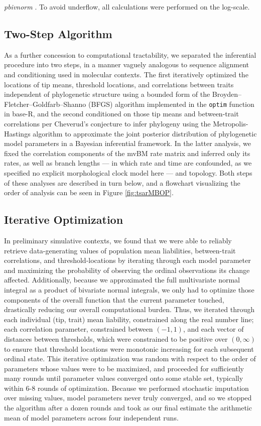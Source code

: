 \documentclass[10pt, twocolumn, twoside]{article}
\begin{document}
\textit{pbivnorm} \citep{kenkelPackagePbivnorm2015}. To avoid underflow, all calculations were performed on the log-scale. 

\subsection{Two-Step Algorithm}

As a further concession to computational tractability, we separated the inferential procedure into two steps, in a manner vaguely analogous to sequence alignment and conditioning used in molecular contexts. The first iteratively optimized the locations of tip means, threshold locations, and correlations between traits independent of phylogenetic structure using a bounded form of the Broyden–Fletcher–Goldfarb–Shanno (BFGS) algorithm implemented in the \texttt{optim} function in base-R, and the second conditioned on those tip means and between-trait correlations per Cheverud's conjecture to infer phylogeny using the Metropolis-Hastings algorithm to approximate the joint posterior distribution of phylogenetic model parameters in a Bayesian inferential framework. In the latter analysis, we fixed the correlation components of the mvBM rate matrix and inferred only its rates, as well as branch lengths --- in which rate and time are confounded, as we specified no explicit morphological clock model here --- and topology. Both steps of these analyses are described in turn below, and a flowchart visualizing the order of analysis can be seen in Figure \ref{fig:tsarMBOP}.

\subsection{Iterative Optimization}

In preliminary simulative contexts, we found that we were able to reliably retrieve data-generating values of population mean liabilities, between-trait correlations, and threshold-locations by iterating through each model parameter and maximizing the probability of observing the ordinal observations its change affected. Additionally, because we approximated the full multivariate normal integral as a product of bivariate normal integrals, we only had to optimize those components of the overall function that the current parameter touched, drastically reducing our overall computational burden. Thus, we iterated through each individual (tip, trait) mean liability, constrained along the real number line; each correlation parameter, constrained between $(-1,1)$, and each vector of distances between thresholds, which were constrained to be positive over $(0, \infty)$ to ensure that threshold locations were monotonic increasing for each subsequent ordinal state. This iterative optimization was random with respect to the order of parameters whose values were to be maximized, and proceeded for sufficiently many rounds until parameter values converged onto some stable set, typically within 6-8 rounds of optimization. Because we performed stochastic imputation over missing values, model parameters never truly converged, and so we stopped the algorithm after a dozen rounds and took as our final estimate the arithmetic mean of model parameters across four independent runs. 
\end{document}
